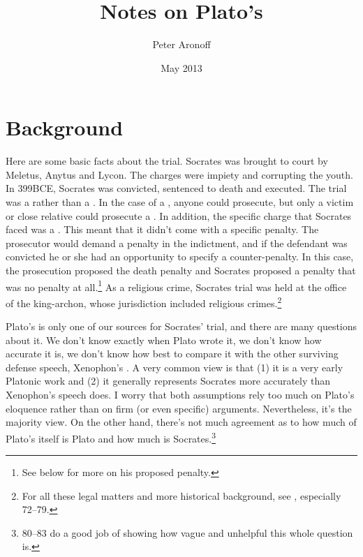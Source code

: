 \documentclass[11pt]{article}
\begin{document}
\begin{titlepage}
\title{Notes on Plato's }
\author{Peter Aronoff}
\date{May 2013}
\maketitle
\end{titlepage}

\section{Background}

Here are some basic facts about the trial.  Socrates was brought to court
by Meletus, Anytus and Lycon.  The charges were impiety and corrupting the
youth.  In 399BCE, Socrates was convicted, sentenced to death and executed.
The trial was a  rather than a .  In the case
of a , anyone could prosecute, but only a victim or close
relative could prosecute a .  In addition, the specific
charge that Socrates faced was a .  This meant that
it didn't come with a specific penalty.  The prosecutor would demand
a penalty in the indictment, and if the defendant was convicted he or she
had an opportunity to specify a counter-penalty.  In this case, the
prosecution proposed the death penalty and Socrates proposed a penalty that
was no penalty at all.\footnote{See below for more on his proposed
penalty.}  As a religious crime, Socrates trial was held at the office of
the king-archon, whose jurisdiction included religious crimes.\footnote{For
all these legal matters and more historical background, see
\citet{brickhouse2004}, especially 72--79.}

Plato's  is only one of our sources for Socrates' trial, and
there are many questions about it.  We don't know exactly when Plato wrote
it, we don't know how accurate it is, we don't know how best to compare it
with the other surviving defense speech, Xenophon's .  A very
common view is that (1) it is a very early Platonic work and (2) it
generally represents Socrates more accurately than Xenophon's speech does.
I worry that both assumptions rely too much on Plato's eloquence rather
than on firm (or even specific) arguments.  Nevertheless, it's the majority
view.  On the other hand, there's not much agreement as to how much of
Plato's  itself is Plato and how much is Socrates.\footnote{
\citet{brickhouse2004} 80--83 do a good job of showing how vague and
unhelpful this whole question is.}
\end{document}
